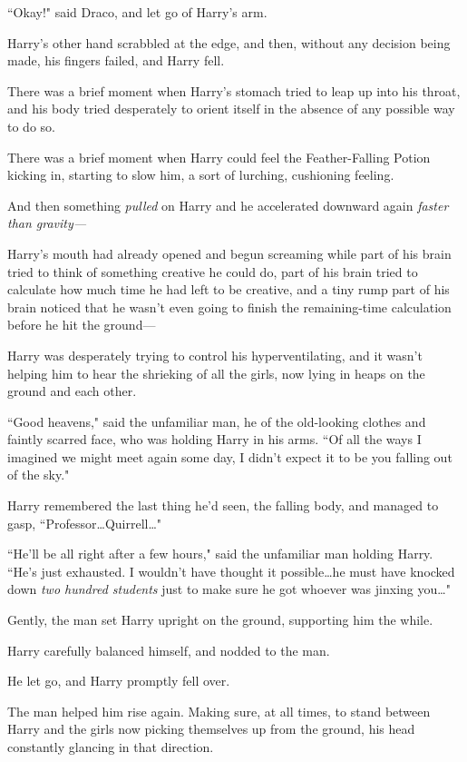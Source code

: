 ``Okay!" said Draco, and let go of Harry's arm.

Harry's other hand scrabbled at the edge, and then, without any decision being made, his fingers failed, and Harry fell.

There was a brief moment when Harry's stomach tried to leap up into his throat, and his body tried desperately to orient itself in the absence of any possible way to do so.

There was a brief moment when Harry could feel the Feather-Falling Potion kicking in, starting to slow him, a sort of lurching, cushioning feeling.

And then something \emph{pulled} on Harry and he accelerated downward again \emph{faster than gravity—}

Harry's mouth had already opened and begun screaming while part of his brain tried to think of something creative he could do, part of his brain tried to calculate how much time he had left to be creative, and a tiny rump part of his brain noticed that he wasn't even going to finish the remaining-time calculation before he hit the ground—

\later

Harry was desperately trying to control his hyperventilating, and it wasn't helping him to hear the shrieking of all the girls, now lying in heaps on the ground and each other.

``Good heavens," said the unfamiliar man, he of the old-looking clothes and faintly scarred face, who was holding Harry in his arms. ``Of all the ways I imagined we might meet again some day, I didn't expect it to be you falling out of the sky."

Harry remembered the last thing he'd seen, the falling body, and managed to gasp, ``Professor…Quirrell…"

``He'll be all right after a few hours," said the unfamiliar man holding Harry. ``He's just exhausted. I wouldn't have thought it possible…he must have knocked down \emph{two hundred students} just to make sure he got whoever was jinxing you…"

Gently, the man set Harry upright on the ground, supporting him the while.

Harry carefully balanced himself, and nodded to the man.

He let go, and Harry promptly fell over.

The man helped him rise again. Making sure, at all times, to stand between Harry and the girls now picking themselves up from the ground, his head constantly glancing in that direction.

